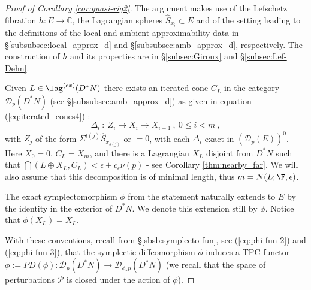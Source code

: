 \begin{proof}[Proof of Corollary \ref{cor:quasi-rig2}] The argument makes use of the 
Lefschetz fibration $\bar{h}:E\to\mathbb{C}$, the Lagrangian spheres  $\hat{S}_{x_{i}}\subset E$ and  of the setting  leading to the definitions of the local and ambient approximability data  in \S\ref{subsubsec:local_approx_d} and \S\ref{subsubsec:amb_approx_d}, respectively. The construction of $\bar{h}$ and its properties are in \S\ref{subsec:Giroux} and \S\ref{subsec:Lef-Dehn}.  

Given $L\in\lag^{(ex)}(D^{\ast}N)$ there exists an iterated cone $C_{L}$ in the category
$\mathscr{D}_{p}(D^{\ast}N)$ (see \S\ref{subsubsec:amb_approx_d}) as given in equation (\ref{eq:iterated_cones4}) :
\begin{equation}\label{eq:iterated_cones7}
 \Delta_{i} \ : \ Z_{i}\longrightarrow X_{i}\longrightarrow X_{i+1} \ , \ 0\leq i < m \ , 
\end{equation}
with $Z_{j}$ of the form $\Sigma^{l(j)}\hat{S}_{x_{s(j)}}$ or $=0$,
with each $\Delta_{i}$  exact in
 $(\mathscr{D}_{p}(E))^{0}$. Here $X_{0}=0$, 
$C_{L}=X_{m}$,  and there is a Lagrangian $X_{L}$  disjoint from $D^{\ast}N$ such that 
$\dint (L\oplus X_{L},C_{L}) <\epsilon + c_{\epsilon}\nu(p)$ - see  Corollary \ref{thm:nearby_far}. We will also assume that this decomposition is of minimal length, thus $m=N(L;\F,\epsilon)$.

The exact symplectomorphism $\phi$ from the statement naturally extends to $E$ by the identity in the exterior of $D^{\ast}N$. We denote this extension still by $\phi$. Notice that $\phi(X_{L})=X_{L}$.

With these conventions, recall from \S\ref{sbsb:symplecto-fun}, see (\ref{eq:phi-fun-2}) and (\ref{eq:phi-fun-3}), that the symplectic diffeomorphism
$\phi$ induces a TPC functor $\bar{\phi}:=PD(\phi) :\mathscr{D}_{p}(D^{\ast}N)\to \mathscr{D}_{\phi_{\ast}p}(D^{\ast}N)$ (we recall that the space of perturbations $\mathcal{P}$ is closed under the action of $\phi$).  


\end{proof}
